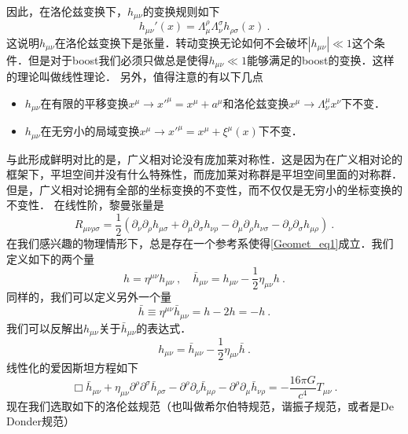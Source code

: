 因此，在洛伦兹变换下，$h_{\mu\nu}$的变换规则如下
\begin{equation}
h_{\mu\nu}'(x) = \Lambda^\rho_\mu\Lambda^\sigma_\nu h_{\rho\sigma} (x) ~. 
\end{equation}
这说明$h_{\mu\nu}$在洛伦兹变换下是张量．转动变换无论如何不会破坏$|h_{\mu\nu}|\ll 1$这个条件．但是对于boost我们必须只做总是使得$h_{\mu\nu}\ll 1$能够满足的boost的变换．这样的理论叫做线性理论．
另外，值得注意的有以下几点
\begin{itemize}
\item $h_{\mu\nu}$在有限的平移变换$x^\mu\rightarrow x'^\mu = x^\mu + a^\mu$和洛伦兹变换$x^\mu\rightarrow \Lambda^\mu_\nu x^\nu$下不变．
\item $h_{\mu\nu}$在无穷小的局域变换$x^\mu \rightarrow x'^\mu = x^\mu + \xi^\mu (x)$下不变．
\end{itemize}
与此形成鲜明对比的是，广义相对论没有庞加莱对称性．这是因为在广义相对论的框架下，平坦空间并没有什么特殊性，而庞加莱对称群是平坦空间里面的对称群．但是，广义相对论拥有全部的坐标变换的不变性，而不仅仅是无穷小的坐标变换的不变性．
在线性阶，黎曼张量是
\begin{equation}
R_{\mu\nu\rho\sigma} = \frac{1}{2}  (\partial_\nu\partial_\rho h_{\mu\sigma} + \partial_\mu\partial_\sigma h_{\nu\rho} - \partial_\mu\partial_\rho h_{\nu\sigma} - \partial_\nu\partial_\sigma h_{\mu\rho}  ) ~.
\end{equation} 
在我们感兴趣的物理情形下，总是存在一个参考系使得\autoref{Geomet_eq1}成立．我们定义如下的两个量 
\begin{equation}
h = \eta^{\mu\nu} h_{\mu\nu} ~, \quad \bar h_{\mu\nu} = h_{\mu\nu} - \frac{1}{2} \eta_{\mu\nu} h~.
\end{equation}
同样的，我们可以定义另外一个量
\begin{equation}
\bar h \equiv \eta^{\mu\nu} \bar h_{\mu\nu} = h - 2 h = -h~.
\end{equation}
我们可以反解出$h_{\mu\nu}$关于$\bar h_{\mu\nu}$的表达式．
\begin{equation}
h_{\mu\nu} = \bar h_{\mu\nu} - \frac{1}{2} \eta_{\mu\nu} \bar h ~. 
\end{equation}
线性化的爱因斯坦方程如下
\begin{equation}\label{Geomet_eq2}
\Box \bar h_{\mu\nu} + \eta_{\mu\nu} \partial^\rho \partial^\sigma \bar h_{\rho\sigma} - \partial^\rho \partial_\nu \bar h_{\mu\rho} - \partial^\rho\partial_\mu \bar h_{\nu\rho} = - \frac{16\pi G}{c^4} T_{\mu\nu} ~. 
\end{equation}
现在我们选取如下的洛伦兹规范（也叫做希尔伯特规范，谐振子规范，或者是De Donder规范）
